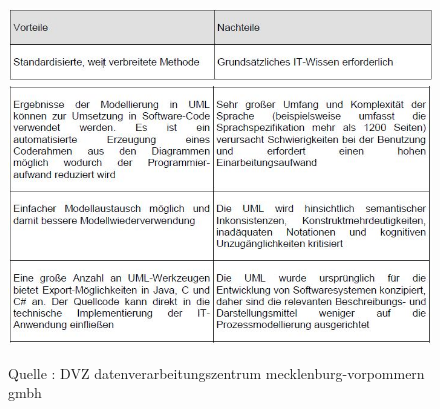 \begin{center}
\begin{figure}[h]
   

\includegraphics[scale=0.8]{Graphics/vornach.jpg}
\includegraphics[scale=0.8]{Graphics/vornach2.jpg} 


Quelle : DVZ datenverarbeitungszentrum mecklenburg-vorpommern gmbh 

 
\label{fig6}


\end{figure}

\end{center}
\newpage